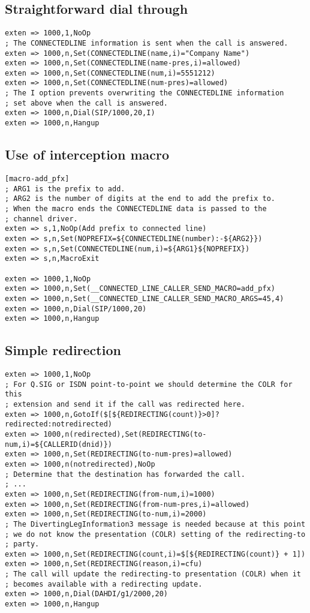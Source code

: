 \subsection{Straightforward dial through}

\begin{verbatim}
exten => 1000,1,NoOp
; The CONNECTEDLINE information is sent when the call is answered.
exten => 1000,n,Set(CONNECTEDLINE(name,i)="Company Name")
exten => 1000,n,Set(CONNECTEDLINE(name-pres,i)=allowed)
exten => 1000,n,Set(CONNECTEDLINE(num,i)=5551212)
exten => 1000,n,Set(CONNECTEDLINE(num-pres)=allowed)
; The I option prevents overwriting the CONNECTEDLINE information
; set above when the call is answered.
exten => 1000,n,Dial(SIP/1000,20,I)
exten => 1000,n,Hangup
\end{verbatim}

\subsection{Use of interception macro}

\begin{verbatim}
[macro-add_pfx]
; ARG1 is the prefix to add.
; ARG2 is the number of digits at the end to add the prefix to.
; When the macro ends the CONNECTEDLINE data is passed to the
; channel driver.
exten => s,1,NoOp(Add prefix to connected line)
exten => s,n,Set(NOPREFIX=${CONNECTEDLINE(number):-${ARG2}})
exten => s,n,Set(CONNECTEDLINE(num,i)=${ARG1}${NOPREFIX})
exten => s,n,MacroExit

exten => 1000,1,NoOp
exten => 1000,n,Set(__CONNECTED_LINE_CALLER_SEND_MACRO=add_pfx)
exten => 1000,n,Set(__CONNECTED_LINE_CALLER_SEND_MACRO_ARGS=45,4)
exten => 1000,n,Dial(SIP/1000,20)
exten => 1000,n,Hangup
\end{verbatim}

\subsection{Simple redirection}
\begin{verbatim}
exten => 1000,1,NoOp
; For Q.SIG or ISDN point-to-point we should determine the COLR for this
; extension and send it if the call was redirected here.
exten => 1000,n,GotoIf($[${REDIRECTING(count)}>0]?redirected:notredirected)
exten => 1000,n(redirected),Set(REDIRECTING(to-num,i)=${CALLERID(dnid)})
exten => 1000,n,Set(REDIRECTING(to-num-pres)=allowed)
exten => 1000,n(notredirected),NoOp
; Determine that the destination has forwarded the call.
; ...
exten => 1000,n,Set(REDIRECTING(from-num,i)=1000)
exten => 1000,n,Set(REDIRECTING(from-num-pres,i)=allowed)
exten => 1000,n,Set(REDIRECTING(to-num,i)=2000)
; The DivertingLegInformation3 message is needed because at this point
; we do not know the presentation (COLR) setting of the redirecting-to
; party.
exten => 1000,n,Set(REDIRECTING(count,i)=$[${REDIRECTING(count)} + 1])
exten => 1000,n,Set(REDIRECTING(reason,i)=cfu)
; The call will update the redirecting-to presentation (COLR) when it
; becomes available with a redirecting update.
exten => 1000,n,Dial(DAHDI/g1/2000,20)
exten => 1000,n,Hangup
\end{verbatim}

